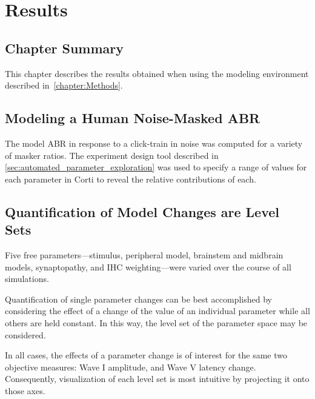 \chapter{Results}
\label{chapter:Results}
\thispagestyle{myheadings}

\graphicspath{{5_Results/Figures/}}
\section{Chapter Summary} %
\label{sec:results_summary}
This chapter describes the results obtained when using the modeling environment described in~\autoref{chapter:Methods}.
\section{Modeling a Human Noise-Masked ABR} %
\label{sec:tone_in_noise}
The model ABR in response to a click-train in noise was computed for a variety of masker ratios.   
The experiment design tool described in \autoref{sec:automated_parameter_exploration} was used to specify a range of values for each parameter in Corti to reveal the relative contributions of each. 

\section{Quantification of Model Changes are Level Sets} %
\label{sec:quantification_of_model_changes_are_level_sets}
Five free parameters---stimulus, peripheral model, brainstem and midbrain models, synaptopathy, and IHC weighting---were varied over the course of all simulations. 

Quantification of single parameter changes can be best accomplished by considering the effect of a change of the value of an individual parameter while all others are held constant.  In this way, the level set of the parameter space may be considered. 

In all cases, the effects of a parameter change is of interest for the same two objective measures: Wave I amplitude, and Wave V latency change.   Consequently, visualization of each level set is most intuitive by projecting it onto those axes. 

